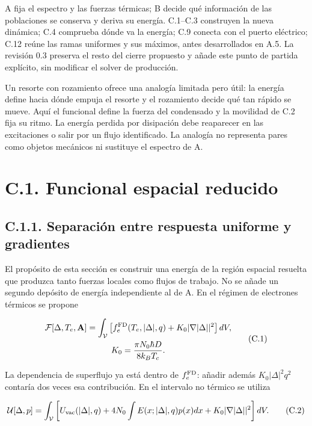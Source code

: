 \documentclass[
  spanish,
  10pt,
  a4paper,
]{article}
\begin{document}
A fija el espectro y las fuerzas térmicas; B decide qué información de
las poblaciones se conserva y deriva su energía. C.1--C.3 construyen la
nueva dinámica; C.4 comprueba dónde va la energía; C.9 conecta con el
puerto eléctrico; C.12 reúne las ramas uniformes y sus máximos, antes
desarrollados en A.5. La revisión 0.3 preserva el resto del cierre
propuesto y añade este punto de partida explícito, sin modificar el
solver de producción.

Un resorte con rozamiento ofrece una analogía limitada pero útil: la
energía define hacia dónde empuja el resorte y el rozamiento decide qué
tan rápido se mueve. Aquí el funcional define la fuerza del condensado y
la movilidad de C.2 fija su ritmo. La energía perdida por disipación
debe reaparecer en las excitaciones o salir por un flujo identificado.
La analogía no representa pares como objetos mecánicos ni sustituye el
espectro de A.

\section{C.1. Funcional espacial
reducido}\label{c.1.-funcional-espacial-reducido}

\subsection{C.1.1. Separación entre respuesta uniforme y
gradientes}\label{c.1.1.-separaciuxf3n-entre-respuesta-uniforme-y-gradientes}

El propósito de esta sección es construir una energía de la región
espacial resuelta que produzca tanto fuerzas locales como flujos de
trabajo. No se añade un segundo depósito de energía independiente al de
A. En el régimen de electrones térmicos se propone

\[
\begin{gathered}
\mathcal F[\Delta,T_e,\mathbf A]=\int_{\mathcal V}
\left[f_e^{\rm FD}(T_e,|\Delta|,q)+K_0|\nabla |\Delta||^2\right]dV,\\
K_0=\frac{\pi N_0\hbar D}{8k_BT_c}.
\end{gathered} \tag{C.1}
\]

La dependencia de superflujo ya está dentro de \(f_e^{\rm FD}\): añadir
además \(K_0|\Delta|^2q^2\) contaría dos veces esa contribución. En el
intervalo no térmico se utiliza

\[
\mathcal U[\Delta,p]=\int_{\mathcal V}
\left[U_{\rm vac}(|\Delta|,q)+4N_0\int E(x;|\Delta|,q)p(x)dx
+K_0|\nabla |\Delta||^2\right]dV. \tag{C.2}
\]
\end{document}
